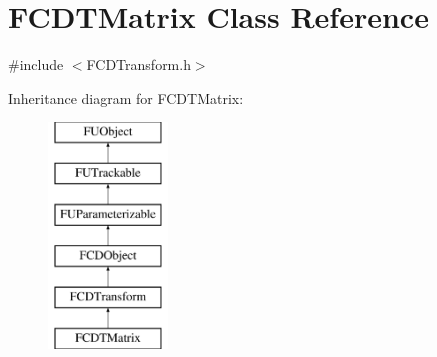 \hypertarget{classFCDTMatrix}{
\section{FCDTMatrix Class Reference}
\label{classFCDTMatrix}
}


{\ttfamily \#include $<$FCDTransform.h$>$}

Inheritance diagram for FCDTMatrix:\begin{figure}[H]
\begin{center}
\leavevmode
\includegraphics[height=6.000000cm]{classFCDTMatrix}
\end{center}
\end{figure}

